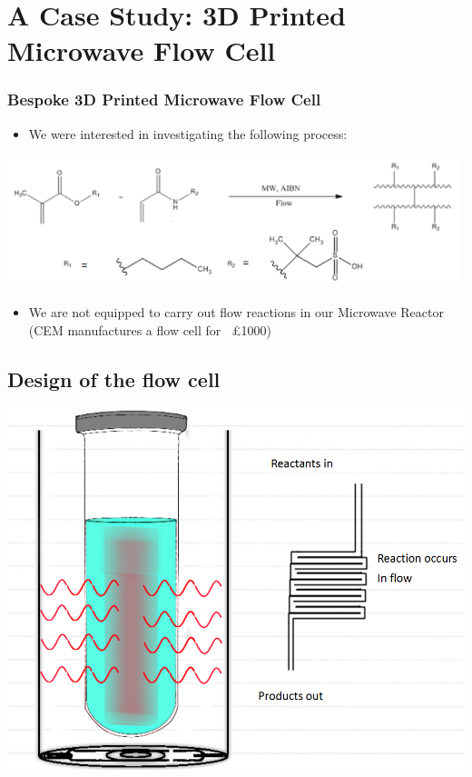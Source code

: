 \documentclass[10pt, compress]{beamer}
\begin{document}
\section{A Case Study: 3D Printed Microwave Flow Cell}
\begin{frame}
\frametitle{Bespoke 3D Printed Microwave Flow Cell}
\begin{itemize}
    \item{We were interested in investigating the following process:}
\end{itemize}

\begin{center}
\includegraphics[width=\textwidth]{mwflowreac.PNG}
\end{center}
\begin{itemize}
    \item{We are not equipped to carry out flow reactions in our Microwave Reactor (CEM manufactures a flow cell for ~£1000)}
\end{itemize}

\end{frame}
\subsection{Design of the flow cell}
\begin{frame}
\includegraphics[width=\textwidth]{reacflow.PNG}
\end{frame}
\end{document}
